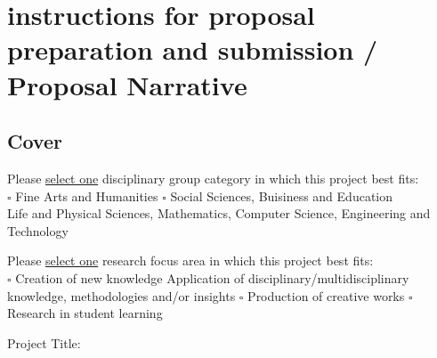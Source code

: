 \documentclass[]{article}
\begin{document}
\section{instructions for proposal preparation and submission / Proposal Narrative}%
\subsection{Cover}%
\noindent{}
Please \underline{select one} disciplinary group category in which this project best fits:\\
 $\square$    Fine Arts and Humanities           $\square$   Social Sciences, Buisiness and Education\\
\Checkedbox   Life and Physical Sciences, Mathematics, Computer Science, Engineering and Technology

\noindent Please \underline{select one} research focus area in which this project best fits:\\
 $\square$ Creation of new knowledge     \Checkedbox Application of disciplinary/multidisciplinary knowledge, methodologies and/or insights     $\square$ Production of creative works  $\square$ Research in student learning

Project Title:

	
\end{document}
